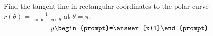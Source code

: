 \documentclass{ximera}
\author{Gregory Hartman \and Matthew Carr}
\begin{document}
\begin{exercise}





Find the tangent line in rectangular coordinates to the polar curve $r(\theta)=\frac{1}{\sin\theta-\cos\theta}$ at $\theta=\pi$. 
 \[
y\begin{prompt}=\answer{x+1}\end{prompt}
 \]      
 
\end{exercise}
\end{document}
